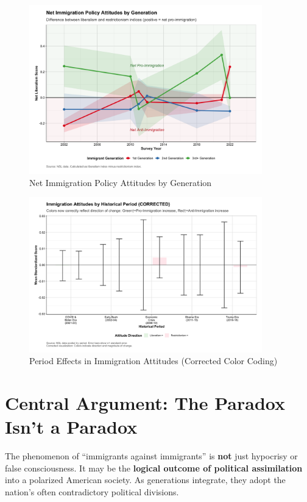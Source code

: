 \documentclass[11pt,letterpaper]{article}
\begin{document}
\begin{figure}[H]
    \centering
    \includegraphics[width=0.9\textwidth]{../../outputs/figure_v4_4_net_liberalism.png}
    \caption{Net Immigration Policy Attitudes by Generation}
    \label{fig:net_liberalism}
\end{figure}

\begin{figure}[H]
    \centering
    \includegraphics[width=0.9\textwidth]{../../outputs/figure_v4_4_period_effects_CORRECTED.png}
    \caption{Period Effects in Immigration Attitudes (Corrected Color Coding)}
    \label{fig:period_effects}
\end{figure}

\section{Central Argument: The Paradox Isn't a Paradox}

The phenomenon of ``immigrants against immigrants'' is \textbf{not} just hypocrisy or false consciousness. It may be the \textbf{logical outcome of political assimilation} into a polarized American society. As generations integrate, they adopt the nation's often contradictory political divisions.
\end{document}
